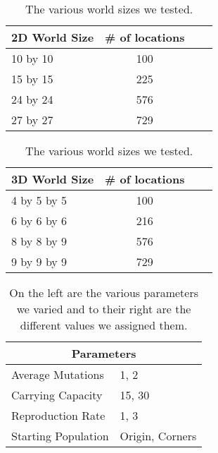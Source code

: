 \documentclass[12pt]{article}
\begin{document}

\begin{table}[tb]
\begin{center}
\begin{tabular}{lccl}
	\textbf{2D World Size} & \textbf{\# of locations} \\ \hline
	10 by 10 & 100 \\
	15 by 15 & 225 \\
	24 by 24 & 576 \\
	27 by 27 & 729 \\
\end{tabular}
\begin{tabular}{lccl}
	\textbf{3D World Size} & \textbf{\# of locations} \\ \hline
	4 by 5 by 5 & 100 \\
	6 by 6 by 6 & 216 \\
	8 by 8 by 9 & 576 \\
	9 by 9 by 9 & 729 \\
\end{tabular}
\caption{The various world sizes we tested.}
\label{tab:worldsizes}
\end{center}
\end{table}


\begin{table}[tb]
\begin{center}
\begin{tabular}{|l|l|}
	\hline
	\multicolumn{2}{|c|}{Parameters} \\
	\hline
	Average Mutations & 1, 2 \\
	Carrying Capacity & 15, 30 \\
	Reproduction Rate & 1, 3 \\
	Starting Population & Origin, Corners \\
	\hline
\end{tabular}
\caption{On the left are the various parameters we varied and to their right are the different values we assigned them.}
\label{tab:parameters}
\end{center}
\end{table}
\end{document}
